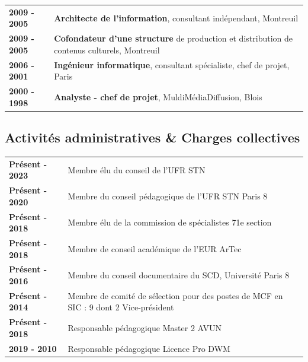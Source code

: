 \documentclass[
  a4paper,
  DIV=11,
  numbers=noendperiod]{scrreprt}
\begin{document}
\begin{longtable}[]{@{}
  >{\raggedright\arraybackslash}p{}
  >{\raggedright\arraybackslash}p{}@{}}
\toprule\noalign{}
\endhead
\bottomrule\noalign{}
\endlastfoot
\textbf{2009 - 2005} & \textbf{Architecte de l'information}, consultant
indépendant, Montreuil \\
\textbf{2009 - 2005} & \textbf{Cofondateur d'une structure} de
production et distribution de contenus culturels, Montreuil \\
\textbf{2006 - 2001} & \textbf{Ingénieur informatique}, consultant
spécialiste, chef de projet, Paris \\
\textbf{2000 - 1998} & \textbf{Analyste - chef de projet},
MuldiMédiaDiffusion, Blois \\
\end{longtable}

\subsection{Activités administratives \& Charges
collectives}\label{activituxe9s-administratives-charges-collectives}

\begin{longtable}[]{@{}
  >{\raggedright\arraybackslash}p{}
  >{\raggedright\arraybackslash}p{}@{}}
\toprule\noalign{}
\endhead
\bottomrule\noalign{}
\endlastfoot
\textbf{Présent - 2023} & Membre élu du conseil de l'UFR STN \\
\textbf{Présent - 2020} & Membre du conseil pédagogique de l'UFR STN
Paris 8 \\
\textbf{Présent - 2018} & Membre élu de la commission de spécialistes
71e section \\
\textbf{Présent - 2018} & Membre de conseil académique de l'EUR ArTec \\
\textbf{Présent - 2016} & Membre du conseil documentaire du SCD,
Université Paris 8 \\
\textbf{Présent - 2014} & Membre de comité de sélection pour des postes
de MCF en SIC : 9 dont 2 Vice-président \\
\textbf{Présent - 2018} & Responsable pédagogique Master 2 AVUN \\
\textbf{2019 - 2010} & Responsable pédagogique Licence Pro DWM \\
\end{longtable}
\end{document}
